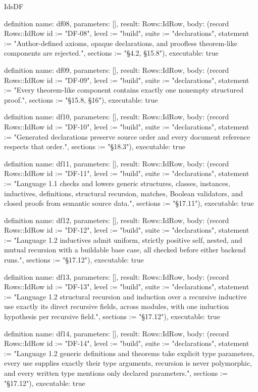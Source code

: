 \begin{lexlean}{IdsDF}
\begin{semanticmodule}
definition{
  name: df08,
  parameters: [],
  result: Rows::IdRow,
  body: (record Rows::IdRow {id := "DF-08", level := "build", suite := "declarations", statement := "Author-defined axioms, opaque declarations, and proofless theorem-like components are rejected.", sections := "§4.2, §15.8"}),
  executable: true
}

definition{
  name: df09,
  parameters: [],
  result: Rows::IdRow,
  body: (record Rows::IdRow {id := "DF-09", level := "build", suite := "declarations", statement := "Every theorem-like component contains exactly one nonempty structured proof.", sections := "§15.8, §16"}),
  executable: true
}

definition{
  name: df10,
  parameters: [],
  result: Rows::IdRow,
  body: (record Rows::IdRow {id := "DF-10", level := "build", suite := "declarations", statement := "Generated declarations preserve source order and every document reference respects that order.", sections := "§18.3"}),
  executable: true
}

definition{
  name: df11,
  parameters: [],
  result: Rows::IdRow,
  body: (record Rows::IdRow {id := "DF-11", level := "build", suite := "declarations", statement := "Language 1.1 checks and lowers generic structures, classes, instances, inductives, definitions, structural recursion, matches, Boolean validators, and closed proofs from semantic source data.", sections := "§17.11"}),
  executable: true
}

definition{
  name: df12,
  parameters: [],
  result: Rows::IdRow,
  body: (record Rows::IdRow {id := "DF-12", level := "build", suite := "declarations", statement := "Language 1.2 inductives admit uniform, strictly positive self, nested, and mutual recursion with a buildable base case, all checked before either backend runs.", sections := "§17.12"}),
  executable: true
}

definition{
  name: df13,
  parameters: [],
  result: Rows::IdRow,
  body: (record Rows::IdRow {id := "DF-13", level := "build", suite := "declarations", statement := "Language 1.2 structural recursion and induction over a recursive inductive use exactly its direct recursive fields, across modules, with one induction hypothesis per recursive field.", sections := "§17.12"}),
  executable: true
}

definition{
  name: df14,
  parameters: [],
  result: Rows::IdRow,
  body: (record Rows::IdRow {id := "DF-14", level := "build", suite := "declarations", statement := "Language 1.2 generic definitions and theorems take explicit type parameters, every use supplies exactly their type arguments, recursion is never polymorphic, and every written type mentions only declared parameters.", sections := "§17.12"}),
  executable: true
}


\end{semanticmodule}
\end{lexlean}
